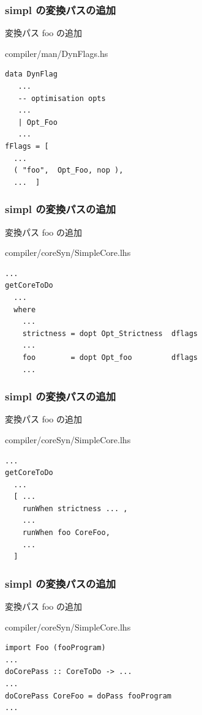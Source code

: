 \documentclass[cjk,dvipdfm,14pt]{beamer}
\begin{document}

\begin{frame}[fragile]
\frametitle{simpl の変換パスの追加}

変換パス foo の追加

\hrulefill

compiler/man/DynFlags.hs

\begin{lstlisting}
data DynFlag
   ...
   -- optimisation opts
   ...
   | Opt_Foo
   ...
fFlags = [
  ...
  ( "foo",  Opt_Foo, nop ),
  ...  ]
\end{lstlisting}

\end{frame}



\begin{frame}[fragile]
\frametitle{simpl の変換パスの追加}

変換パス foo の追加

\hrulefill

compiler/coreSyn/SimpleCore.lhs

\begin{lstlisting}
...
getCoreToDo
  ...
  where
    ...
    strictness = dopt Opt_Strictness  dflags
    ...
    foo        = dopt Opt_foo         dflags
    ...
\end{lstlisting}

\end{frame}

\begin{frame}[fragile]
\frametitle{simpl の変換パスの追加}

変換パス foo の追加

\hrulefill

compiler/coreSyn/SimpleCore.lhs

\begin{lstlisting}
...
getCoreToDo
  ...
  [ ...
    runWhen strictness ... ,
    ...
    runWhen foo CoreFoo,
    ...
  ]
\end{lstlisting}

\end{frame}

\begin{frame}[fragile]
\frametitle{simpl の変換パスの追加}

変換パス foo の追加

\hrulefill

compiler/coreSyn/SimpleCore.lhs

\begin{lstlisting}
import Foo (fooProgram)
...
doCorePass :: CoreToDo -> ...
...
doCorePass CoreFoo = doPass fooProgram
...
\end{lstlisting}

\end{frame}
\end{document}
